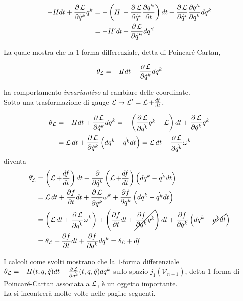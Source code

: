 \begin{equation*}
\begin{aligned}
- H dt + \frac{\partial \operatorname{\mathcal{L}}}{\partial \dot{q}^k} q^k
&= - \left(H' - \frac{\partial \operatorname{\mathcal{L}}}{\partial \dot{q}^i}\frac{\partial q'^i}{\partial t}\right)dt + \frac{\partial \operatorname{\mathcal{L}}}{\partial \dot{q}^i}\frac{\partial q'^i}{\partial q^k} dq^k \\
&= -H'dt + \frac{\partial \operatorname{\mathcal{L}}}{\partial \dot{q}'^i} dq'^i
\end{aligned}
\end{equation*}

La quale mostra che la $ 1 $-forma differenziale, detta di Poincaré-Cartan,

\begin{equation*}
\theta_{\operatorname{\mathcal{L}}} = - H dt + \frac{\partial \operatorname{\mathcal{L}}}{\partial \dot{q}^k} dq^k
\end{equation*}

ha comportamento \textit{invariantivo} al cambiare delle coordinate. \\

Sotto una trasformazione di gauge $ \operatorname{\mathcal{L}} \rightarrow \operatorname{\mathcal{L}}' = \operatorname{\mathcal{L}} + \frac{df}{dt} $,

\begin{equation*}
\begin{aligned}
\theta_{\operatorname{\mathcal{L}}}
&= - H dt + \frac{\partial \operatorname{\mathcal{L}}}{\partial \dot{q}^k} dq^k = - \left (\frac{\partial \operatorname{\mathcal{L}}}{\partial \dot{q^k}}\dot{q^k} - \operatorname{\mathcal{L}} \right) dt + \frac{\partial \operatorname{\mathcal{L}}}{\partial \dot{q}^k} q^k \\
&= \operatorname{\mathcal{L}} dt + \frac{\partial \operatorname{\mathcal{L}}}{\partial \dot{q}^k} \left( dq^k - \dot{q^k} dt \right) = \operatorname{\mathcal{L}} dt + \frac{\partial \operatorname{\mathcal{L}}}{\partial \dot{q^k}}\omega^k
\end{aligned}
\end{equation*}
diventa
\begin{equation*}
\begin{aligned}
\theta'_{\operatorname{\mathcal{L}}} 
&= \left( \operatorname{\mathcal{L}} + \frac{df}{dt} \right) dt + \frac{\partial}{\partial \dot{q}^k} \left( \operatorname{\mathcal{L}} + \frac{df}{dt} \right) \left(dq^k - \dot{q^k} dt \right) \\
&= \operatorname{\mathcal{L}} dt + \frac{\partial f}{\partial t} dt + \frac{\partial \operatorname{\mathcal{L}}}{\partial \dot{q^k}}\omega^k + \frac{\partial f}{\partial q^k} \left(dq^k - \dot{q^k} dt\right) \\
&= \left( \operatorname{\mathcal{L}} dt + \frac{\partial \operatorname{\mathcal{L}}}{\partial \dot{q^k}}\omega^k \right) + \left( \frac{\partial f}{\partial t} dt + \cancel{\frac{\partial f}{\partial q^k} \dot{q^k}} \right) dt + \frac{\partial f}{\partial q^k} \left(dq^k - \cancel{\dot{q^k} dt}\right) \\
&= \theta_{\operatorname{\mathcal{L}}} + \frac{\partial f}{\partial t} dt + \frac{\partial f}{\partial q^k} dq^k = \theta_{\operatorname{\mathcal{L}}} + df
\end{aligned}
\end{equation*}

I calcoli come svolti mostrano che la $ 1 $-forma differenziale $ \theta_{\operatorname{\mathcal{L}}} = - H (t, q, \dot{q}) dt + \frac{\partial \operatorname{\mathcal{L}}}{\partial \dot{q^k}} (t, q, \dot{q}) dq^k $ sullo spazio $ j_1 (\mathcal{V}_{n+1}) $, detta $ 1 $-forma di Poincaré-Cartan associata a $ \operatorname{\mathcal{L}} $, è un oggetto importante. \\
La si incontrerà molte volte nelle pagine seguenti.

